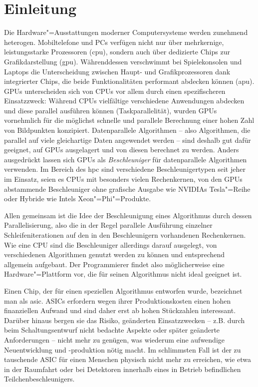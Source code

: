 \chapter{Einleitung}\label{einleitung}

Die Hardware"=Ausstattungen moderner Computersysteme werden zunehmend heterogen.
Mobiltelefone und PCs verfügen nicht nur über mehrkernige, leistungsstarke
Prozessoren (\gls{cpu}), sondern auch über dedizierte Chips zur
Grafikdarstellung (\gls{gpu}). Währenddessen verschwimmt bei Spielekonsolen und
Laptops die Unterscheidung zwischen Haupt- und Grafikprozessoren dank
integrierter Chips, die beide Funktionalitäten performant abdecken können
(\gls{apu}). GPUs unterscheiden sich von CPUs vor allem durch einen
spezifischeren Einsatzzweck: Während CPUs vielfältige verschiedene
Anwendungen abdecken und diese parallel ausführen können (Taskparallelität),
wurden GPUs vornehmlich für die möglichst schnelle und parallele Berechnung
einer hohen Zahl von Bildpunkten konzipiert. Datenparallele Algorithmen -- also
Algorithmen, die parallel auf viele gleichartige Daten angewendet werden -- sind
deshalb gut dafür geeignet, auf GPUs ausgelagert und von diesen berechnet zu
werden. Anders ausgedrückt lassen sich GPUs als \textit{Beschleuniger} für
datenparallele Algorithmen verwenden. Im Bereich des \gls{hpc} sind verschiedene
Beschleunigertypen seit jeher im Einsatz, seien es CPUs mit besonders vielen
Rechenkernen, von den GPUs abstammende Beschleuniger ohne grafische Ausgabe wie
NVIDIAs Tesla"=Reihe oder Hybride wie Intels Xeon"=Phi"=Produkte.

Allen gemeinsam ist die Idee der Beschleunigung eines Algorithmus durch dessen
Parallelisierung, also die in der Regel parallele Ausführung einzelner
Schleifeniterationen auf den in den Beschleunigern vorhandenen Rechenkernen.
Wie eine CPU sind die Beschleuniger allerdings darauf ausgelegt, von
verschiedenen Algorithmen genutzt werden zu können und entsprechend allgemein
aufgebaut. Der Programmierer findet also möglicherweise eine Hardware"=Plattform
vor, die für seinen Algorithmus nicht ideal geeignet ist.

Einen Chip, der für einen speziellen Algorithmus entworfen wurde, bezeichnet man
als \gls{asic}. ASICs erfordern wegen ihrer Produktionskosten einen hohen
finanziellen Aufwand und sind daher erst ab hohen Stückzahlen interessant.
Darüber hinaus bergen sie das Risiko, geänderten Einsatzzwecken -- z.B. durch
beim Schaltungsentwurf nicht bedachte Aspekte oder später geänderte
Anforderungen -- nicht mehr zu genügen, was wiederum eine aufwendige
Neuentwicklung und -produktion nötig macht. Im schlimmsten Fall ist der zu
tauschende ASIC für einen Menschen physisch nicht mehr zu erreichen, wie etwa in
der Raumfahrt oder bei Detektoren innerhalb eines in Betrieb befindlichen
Teilchenbeschleunigers.


